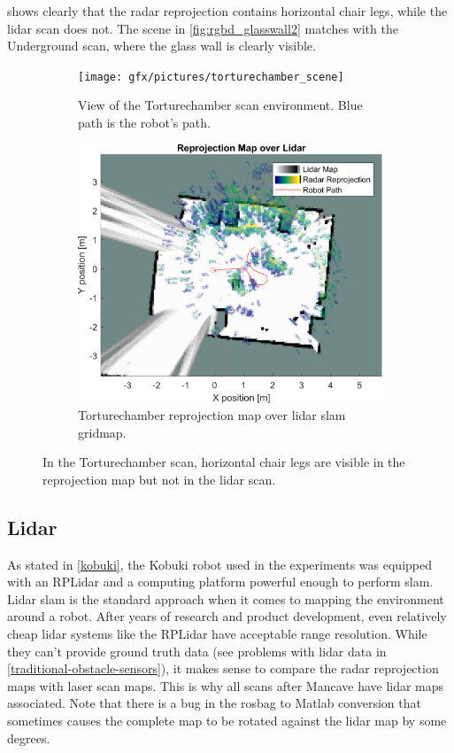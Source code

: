  shows clearly that the radar reprojection contains horizontal chair legs, while the lidar scan does not. The scene in \cref{fig:rgbd_glasswall2} matches with the Underground scan, where the glass wall is clearly visible.

\begin{figure}
    \begin{subfigure}[t]{.485\textwidth}
        \centering
        \texttt{[image: gfx/pictures/torturechamber\_scene]}
        \caption{View of the Torturechamber scan environment. Blue path is the robot's path.}
        \label{fig:chairs_scene}
    \end{subfigure}%
    \hfill%
    \begin{subfigure}[t]{.485\textwidth}
        \centering
        \includegraphics[max width=\textwidth]{gfx/results/torturechamber_map}
        \caption{Torturechamber reprojection map over lidar slam gridmap.}
        \label{fig:chairs_map}
    \end{subfigure}%
    \caption{In the Torturechamber scan, horizontal chair legs are visible in the reprojection map but not in the lidar scan.}
    \label{fig:chairlegs}
\end{figure}

\subsection{Lidar}\label{lidar-1}
As stated in \cref{kobuki}, the Kobuki robot used in the experiments was equipped with an RPLidar and a computing platform powerful enough to perform slam. Lidar slam is the standard approach when it comes to mapping the environment around a robot. After years of research and product development, even relatively cheap lidar systems like the RPLidar have acceptable range resolution. While they can't provide ground truth data (see problems with lidar data in \cref{traditional-obstacle-sensors}), it makes sense to compare the radar reprojection maps with laser scan maps. This is why all scans after Mancave have lidar maps associated.
Note that there is a bug in the rosbag to Matlab conversion that sometimes causes the complete map to be rotated against the lidar map by some degrees.
